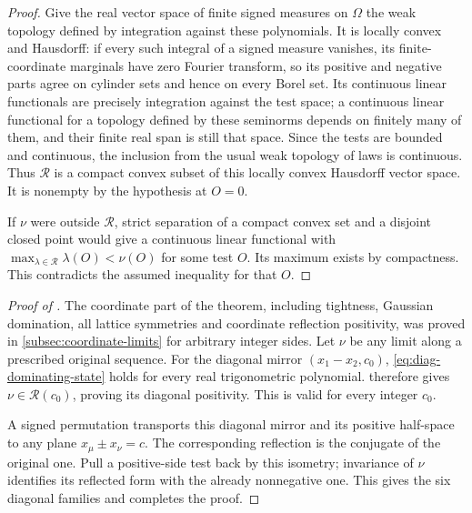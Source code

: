 \documentclass[11pt,letterpaper,reqno]{amsart}
\begin{document}
\begin{proof}
Give the real vector space of finite signed measures on
$\Omega$ the weak topology defined by integration against
these polynomials. It is locally convex and Hausdorff:
if every such integral of a signed measure vanishes, its
finite-coordinate marginals have zero Fourier transform,
so its positive and negative parts agree on cylinder sets
and hence on every Borel set. Its continuous linear
functionals are precisely integration against the test
space; a continuous linear functional for a topology
defined by these seminorms depends on finitely many of
them, and their finite real span is still that space.
Since the tests are bounded and continuous, the inclusion
from the usual weak topology of laws is continuous.
Thus $\mathcal R$ is a compact convex subset of this
locally convex Hausdorff vector space. It is nonempty
by the hypothesis at $O=0$.

If $\nu$ were outside $\mathcal R$, strict separation
\cite[Theorem~6.2.9]{Peterson2017} of
a compact convex set and a disjoint closed point would
give a continuous linear functional with
$\max_{\lambda\in\mathcal R}\lambda(O)<\nu(O)$ for some
test $O$. Its maximum exists by compactness. This contradicts
the assumed inequality for that $O$.
\end{proof}

\begin{proof}[Proof of ]

The coordinate part of the theorem, including tightness, Gaussian
domination, all lattice symmetries and coordinate reflection positivity,
was proved in \cref{subsec:coordinate-limits} for arbitrary integer
sides. Let $\nu$ be any limit along a prescribed original sequence.
For the diagonal mirror $(x_1-x_2,c_0)$,
\eqref{eq:diag-dominating-state} holds for every real
trigonometric polynomial. 
therefore gives $\nu\in\mathcal R(c_0)$, proving its
diagonal positivity. This is valid for every integer
$c_0$.

A signed permutation transports this diagonal mirror
and its positive half-space to any plane
$x_\mu\pm x_\nu=c$. The corresponding reflection is the
conjugate of the original one. Pull a positive-side test
back by this isometry; invariance of $\nu$ identifies
its reflected form with the already nonnegative one.
This gives the six diagonal families and completes
the proof.
\end{proof}

\printbibliography
\end{document}
